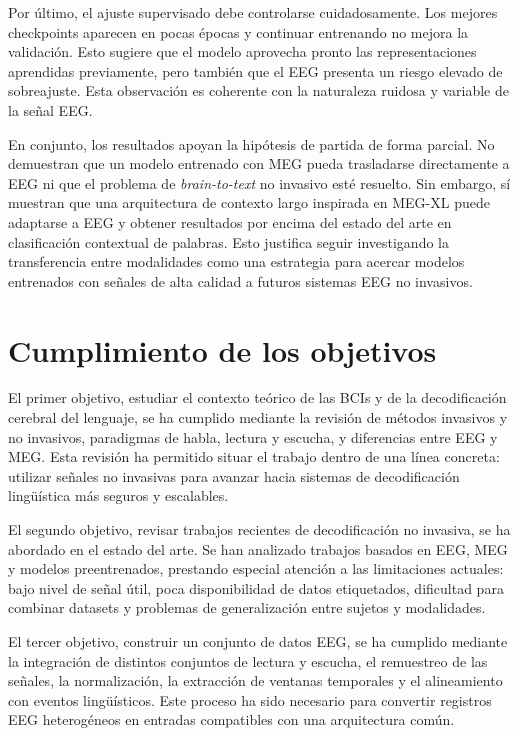 Por último, el ajuste supervisado debe controlarse cuidadosamente. Los mejores checkpoints aparecen en pocas épocas y continuar entrenando no mejora la validación. Esto sugiere que el modelo aprovecha pronto las representaciones aprendidas previamente, pero también que el EEG presenta un riesgo elevado de sobreajuste. Esta observación es coherente con la naturaleza ruidosa y variable de la señal EEG.

En conjunto, los resultados apoyan la hipótesis de partida de forma parcial. No demuestran que un modelo entrenado con MEG pueda trasladarse directamente a EEG ni que el problema de \textit{brain-to-text} no invasivo esté resuelto. Sin embargo, sí muestran que una arquitectura de contexto largo inspirada en MEG-XL puede adaptarse a EEG y obtener resultados por encima del estado del arte en clasificación contextual de palabras. Esto justifica seguir investigando la transferencia entre modalidades como una estrategia para acercar modelos entrenados con señales de alta calidad a futuros sistemas EEG no invasivos.

\section{Cumplimiento de los objetivos}

El primer objetivo, estudiar el contexto teórico de las BCIs y de la decodificación cerebral del lenguaje, se ha cumplido mediante la revisión de métodos invasivos y no invasivos, paradigmas de habla, lectura y escucha, y diferencias entre EEG y MEG. Esta revisión ha permitido situar el trabajo dentro de una línea concreta: utilizar señales no invasivas para avanzar hacia sistemas de decodificación lingüística más seguros y escalables.

El segundo objetivo, revisar trabajos recientes de decodificación no invasiva, se ha abordado en el estado del arte. Se han analizado trabajos basados en EEG, MEG y modelos preentrenados, prestando especial atención a las limitaciones actuales: bajo nivel de señal útil, poca disponibilidad de datos etiquetados, dificultad para combinar datasets y problemas de generalización entre sujetos y modalidades.

El tercer objetivo, construir un conjunto de datos EEG, se ha cumplido mediante la integración de distintos conjuntos de lectura y escucha, el remuestreo de las señales, la normalización, la extracción de ventanas temporales y el alineamiento con eventos lingüísticos. Este proceso ha sido necesario para convertir registros EEG heterogéneos en entradas compatibles con una arquitectura común.

